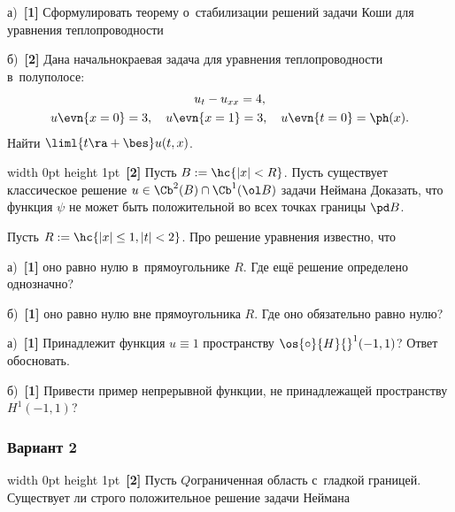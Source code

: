 \documentclass[a4paper]{article}
\def\s#1{~{\textbf{[#1]}}}
\def\nul{{\vrule width 0pt height 1pt}}
\begin{document}
\begin{problem}

а)\s1 Сформулировать теорему о~стабилизации решений задачи Коши для уравнения теплопроводности

б)\s2 Дана начально\д краевая задача для уравнения теплопроводности в~полуполосе:
\begin{gather*}
u_t - u_{xx} = 4,\\
u\evn{x=0} = 3, \quad u\evn{x=1} = 3, \quad u\evn{t=0} = \ph(x).
\end{gather*}
Найти $\liml{t\ra+\bes} u(t,x)$.
\end{problem}

\begin{problem}

\nul\phantom{б)}\s2 Пусть $B := \hc{ |x| < R}$. Пусть существует классическое
решение $u \in \Cb^2(B) \cap \Cb^1(\ol B)$ задачи Неймана
Доказать, что функция $\psi$ не может быть положительной во всех точках границы $\pd B$.
\end{problem}


\begin{problem}
Пусть $R := \hc{|x| \le 1, |t| < 2}$.
Про решение уравнения
известно, что

а)\s1 оно равно нулю в~прямоугольнике $R$. Где ещё решение определено однозначно?

б)\s1 оно равно нулю вне прямоугольника $R$. Где оно обязательно равно нулю?
\end{problem}


\begin{problem}

а)\s1 Принадлежит функция $u \equiv 1$ пространству $\os{\circ}{H}{}^1(-1,1)$? Ответ обосновать.

б)\s1 Привести пример непрерывной функции, не принадлежащей пространству $H^1(-1,1)$?
\end{problem}


\subsubsection{Вариант 2}

\setcounter{problem}{0}

\begin{problem}

\nul\phantom{б)}\s2 Пусть $Q$\т ограниченная область с~гладкой границей. Существует ли строго положительное решение
задачи Неймана
\end{problem}
\end{document}
